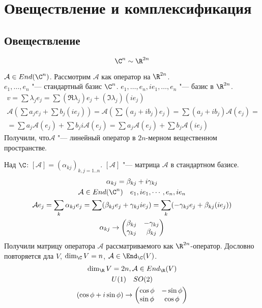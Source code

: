 ﻿\section{Овеществление и комплексификация}
\subsection{Овеществление}

\[ \C^n \sim \R^{2n} \]

$\mathcal A \in End(\C^n)$.
Рассмотрим $\mathcal A$ как оператор на $\R^{2n}$.\\
$e_1, \dots, e_n$ "--- стандартный базис $\C^n$.
$e_1, \dots, e_n, ie_1, \dots, e_n$ "--- базис в $\R^{2n}$.
\begin{gather*}
	v
	= \sum \lambda_j e_j
	= \sum (\Re \lambda_j) e_j + (\Im \lambda_j) (i e_j) \\
	\mathcal A \left(\sum a_j e_j + \sum b_j(i e_j)\right)
	= \mathcal A \left(\sum(a_j + i b_j)e_j \right)
	= \sum (a_j + ib_j) \mathcal A(e_j) = \\
	= \sum a_j \mathcal A(e_j) + \sum b_j i \mathcal A(e_j)
	= \sum a_j \mathcal A(e_j) + \sum b_j \mathcal A(ie_j)
\end{gather*}
Получили, что$\mathcal A$ "--- линейный оператор в $2n$-мерном вещественном пространстве.

Над $\C$: $[\mathcal A] = (\alpha_{kj})_{k, j = 1..n}$.
$[\mathcal A]$ "--- матрица $\mathcal A$ в стандартном базисе.
\begin{gather*}
	\alpha_{kj} = \beta_{kj} + i \gamma_{kj} \\
	\mathcal A \in End(\C^n) \quad e_1, ie_1, \cdots, e_n, ie_n \\
	\mathcal Ae_j
	= \sum_k \alpha_{kj}e_j
	= \sum (\beta_{kj}e_j + \gamma_{kj}ie_j)
	= \sum_k(-\gamma_{kj}e_j + \beta_{kj}(ie_j)) \\
	\alpha_{kj} \to \begin{pmatrix}
		\beta_{kj}  & -\gamma_{kj} \\
		\gamma_{kj} & \beta_{kj}
	\end{pmatrix}
\end{gather*}
Получили матрицу оператора $\mathcal A$ рассматриваемого как $\R^{2n}$-оператор.
Дословно повторяется дла $V$, $\dim_{\C}V = n$, $\mathcal A \in \End_{\C}(V)$.
\begin{gather*}
	\dim_{\R}V = 2n, \mathcal A \in End_{\R}(V) \\
	U(1) \quad SO(2) \\
	(\cos\phi + i \sin \phi) \to \begin{pmatrix}
		\cos \phi & -\sin \phi \\
		\sin \phi &  \cos \phi
	\end{pmatrix}
\end{gather*}

